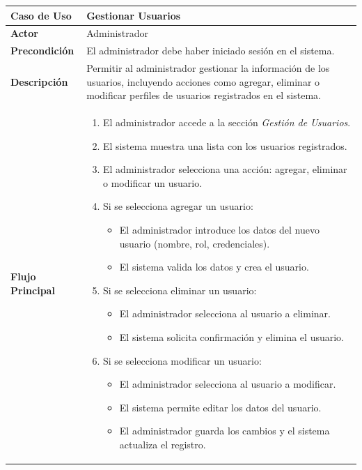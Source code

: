 \documentclass{article}
\begin{document}
\begin{table}[H]
    \centering
    \begin{tabular}{|p{4cm}|p{11cm}|}
    \hline
    \textbf{Caso de Uso}        & \textbf{Gestionar Usuarios} \\ \hline
    \textbf{Actor}              & Administrador \\ \hline
    \textbf{Precondición}       & El administrador debe haber iniciado sesión en el sistema. \\ \hline
    \textbf{Descripción}        & Permitir al administrador gestionar la información de los usuarios, incluyendo acciones como agregar, eliminar o modificar perfiles de usuarios registrados en el sistema. \\ \hline
    \textbf{Flujo Principal}    & 
    \begin{enumerate}
        \item El administrador accede a la sección \textit{Gestión de Usuarios}.
        \item El sistema muestra una lista con los usuarios registrados.
        \item El administrador selecciona una acción: agregar, eliminar o modificar un usuario.
        \item Si se selecciona agregar un usuario:
        \begin{itemize}
            \item El administrador introduce los datos del nuevo usuario (nombre, rol, credenciales).
            \item El sistema valida los datos y crea el usuario.
        \end{itemize}
        \item Si se selecciona eliminar un usuario:
        \begin{itemize}
            \item El administrador selecciona al usuario a eliminar.
            \item El sistema solicita confirmación y elimina el usuario.
        \end{itemize}
        \item Si se selecciona modificar un usuario:
        \begin{itemize}
            \item El administrador selecciona al usuario a modificar.
            \item El sistema permite editar los datos del usuario.
            \item El administrador guarda los cambios y el sistema actualiza el registro.

\end{itemize}
\end{enumerate}
\end{tabular}
\end{table}
\end{document}
